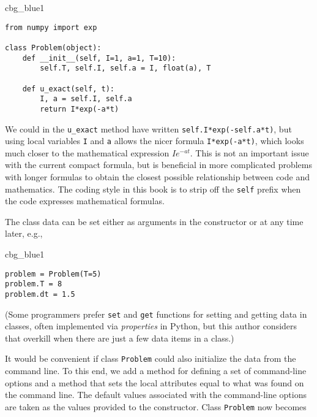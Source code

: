 \documentclass[graybox,sectrefs,envcountresetchap,open=right,final]{svmonodo}
\newenvironment{_cod_tight}[1]{
   \def\FrameCommand{\colorbox{#1}}
   \FrameRule0.6pt\MakeFramed {\FrameRestore}\vskip3mm}
   {\vskip0mm\endMakeFramed}
\newenvironment{cod}[1]{
\bgroup\rmfamily
\fboxsep=0mm\relax
\begin{_cod_tight}{#1}
\list{}{\parsep=-2mm\parskip=0mm\topsep=0pt\leftmargin=2mm
\rightmargin=2\leftmargin\leftmargin=4pt\relax}
\item\relax}
{\endlist\end{_cod_tight}\egroup}
\begin{document}
\begin{cod}{cbg_blue1}\begin{Verbatim}[numbers=none,fontsize=\fontsize{9pt}{9pt},baselinestretch=0.95,xleftmargin=2mm]
from numpy import exp

class Problem(object):
    def __init__(self, I=1, a=1, T=10):
        self.T, self.I, self.a = I, float(a), T

    def u_exact(self, t):
        I, a = self.I, self.a
        return I*exp(-a*t)
\end{Verbatim}
\end{cod}
\noindent
We could in the \Verb!u_exact! method have written
\texttt{self.I*exp(-self.a*t)}, but using local variables \texttt{I} and \texttt{a} allows
the nicer formula \texttt{I*exp(-a*t)}, which looks much closer to the mathematical
expression $Ie^{-at}$.  This is not an important issue with the
current compact formula, but is beneficial in more complicated
problems with longer formulas to obtain the closest possible
relationship between code and mathematics. The coding style in
this book is to strip
off the \texttt{self} prefix when the code expresses mathematical formulas.

The class data can be set either as arguments in the constructor or
at any time later, e.g.,

\begin{cod}{cbg_blue1}\begin{Verbatim}[numbers=none,fontsize=\fontsize{9pt}{9pt},baselinestretch=0.95,xleftmargin=2mm]
problem = Problem(T=5)
problem.T = 8
problem.dt = 1.5
\end{Verbatim}
\end{cod}
\noindent
(Some programmers prefer \texttt{set} and \texttt{get} functions for setting and getting
data in classes, often implemented via \emph{properties} in Python, but
this author considers that overkill when there are just a few data items
in a class.)

It would be convenient if class \texttt{Problem} could also initialize
the data from the command line. To this end, we add a method for
defining a set of command-line options and a method that sets the
local attributes equal to what was found on the command line.
The default values associated with the command-line options are taken
as the values provided to the constructor. Class \texttt{Problem} now becomes
\end{document}

